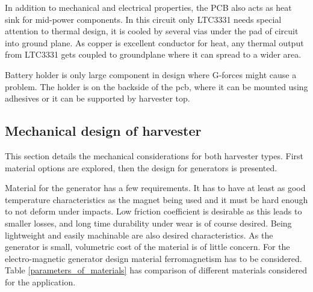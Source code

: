 In addition to mechanical and electrical properties, the PCB also acts as heat sink for mid-power components. In this circuit only LTC3331 needs special attention to thermal design, it is cooled by several vias under the pad of circuit into ground plane. As copper is excellent conductor for heat, any thermal output from LTC3331 gets coupled to groundplane where it can spread to a wider area.

Battery holder is only large component in design where G-forces might cause a problem. The holder is on the backside of the pcb, where it can be mounted using adhesives or it can be supported by harvester top.

\subsection{Mechanical design of harvester}
This section details the mechanical considerations for both harvester types. First material options are explored, then the design for generators is presented.

Material for the generator has a few requirements. It has to have at least as good temperature characteristics as the magnet being used and it must be hard enough to not deform under impacts. Low friction coefficient is desirable as this leads to smaller losses, and long time durability under wear is of course desired. Being lightweight and easily machinable are also desired characteristics. As the generator is small, volumetric cost of the material is of little concern. For the electro-magnetic generator design material ferromagnetism has to be considered. Table \ref{parameters_of_materials} has comparison of different materials considered for the application.

